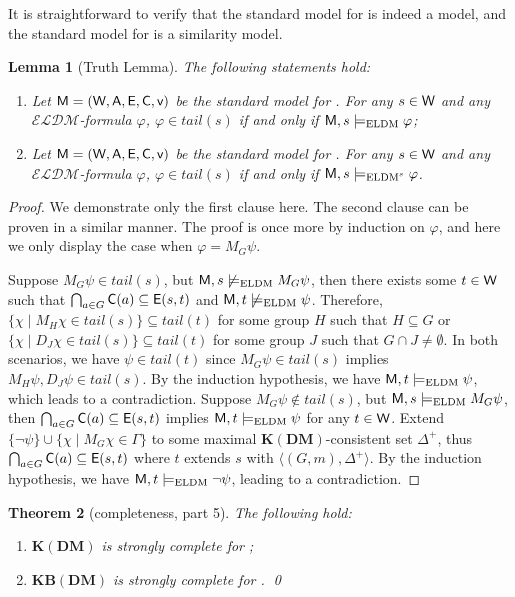 \documentclass{article}
\newtheorem{theorem}{Theorem}
\newtheorem{lemma}[theorem]{Lemma}%
\newcommand{\CA}{\textnormal{\sf A}\xspace}
\newcommand{\CC}{\textnormal{\sf C}\xspace}
\newcommand{\CE}{\textnormal{\sf E}\xspace}
\newcommand{\CM}{\textnormal{\sf M}\xspace}
\newcommand{\CV}{\textnormal{\sf v}\xspace}
\newcommand{\CW}{\textnormal{\sf W}\xspace}
\renewcommand{\phi}{\varphi}
\newcommand{\langdm}{\ensuremath{\mathcal{ELDM}}\xspace}
\newcommand{\ldm}{\text{\normalfont ELDM}\xspace}
\newcommand{\lsdm}{\text{\normalfont ELDM$^s$}\xspace}
\newcommand{\KDM}{\ensuremath{\mathbf{K(DM)}}\xspace}
\newcommand{\KBDM}{\ensuremath{\mathbf{KB(DM)}}\xspace}
\begin{document}
It is straightforward to verify that the standard model for \ldm is indeed a model, and the standard model for \lsdm is a similarity model.

\begin{lemma}[Truth Lemma]\label{lem:truthdm}
The following statements hold:
\begin{enumerate}
\item\label{it:truthdm1} Let $\CM = (\CW, \CA, \CE, \CC, \CV)$ be the standard model for \ldm. For any $s \in \CW$ and any \langdm-formula $\phi$, $\phi \in tail(s)$ if and only if $\CM,s \models_{\ldm} \phi$;
\item\label{it:truthdm2} Let $\CM = (\CW, \CA, \CE, \CC, \CV)$ be the standard model for \lsdm. For any $s \in \CW$ and any \langdm-formula $\phi$, $\phi\in tail(s)$ if and only if $\CM,s\models_{\lsdm}\phi$.
\end{enumerate}
\end{lemma}
\begin{proof}
We demonstrate only the first clause here. The second clause can be proven in a similar manner. The proof is once more by induction on $\phi$, and here we only display the case when $\phi=M_G\psi$.

Suppose $M_G\psi\in tail(s)$, but $\CM,s\not\models_\ldm M_G\psi$, then there exists some $t\in \CW$ such that $\bigcap_{a\in G}\CC(a)\subseteq \CE (s,t)$ and $\CM,t\not\models_\ldm \psi$. Therefore, $\{\chi\mid M_H\chi\in tail(s)\}\subseteq tail(t)$ for some group $H$ such that $H\subseteq G$ or $\{\chi\mid D_J\chi\in tail(s)\}\subseteq tail(t)$ for some group $J$ such that $G\cap J\neq\emptyset$. In both scenarios, we have $\psi\in tail(t)$ since $M_G\psi\in tail(s)$ implies $M_H\psi, D_J\psi\in tail(s)$. By the induction hypothesis, we have $\CM,t\models_\ldm \psi$, which leads to a contradiction.
%
Suppose $M_G\psi\notin tail(s)$, but $\CM,s\models_\ldm M_G\psi$, then $\bigcap_{a\in G}\CC(a)\subseteq \CE (s,t)$ implies $\CM,t\models_\ldm \psi$ for any $t\in \CW$. Extend $\{\neg\psi\}\cup\{\chi\mid M_G\chi\in\Gamma\}$ to some maximal \KDM-consistent set $\Delta^+$, thus $\bigcap_{a\in G}\CC(a)\subseteq \CE(s,t)$ where $t$ extends $s$ with $\langle (G,m),\Delta^+\rangle$. By the induction hypothesis, we have $\CM,t\models_\ldm \neg\psi$, leading to a contradiction.
\end{proof}

\begin{theorem}[completeness, part 5]\label{thm:completeness5}
The following hold:
\begin{enumerate}
\item \KDM is strongly complete for \ldm;
\item \KBDM is strongly complete for \lsdm.
\qed
\end{enumerate}
\end{theorem}
\end{document}
